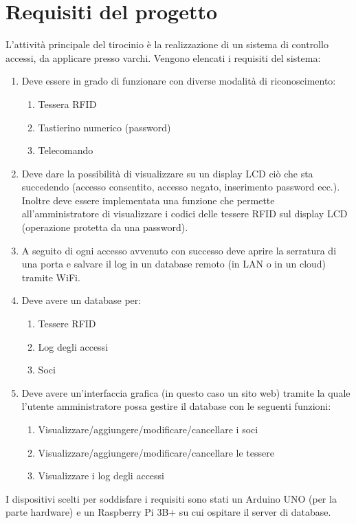 \documentclass[12pt]{report}
\begin{document}
\pagebreak
  
%
\section{Requisiti del progetto}\label{sec:req}
%

L'attività principale del tirocinio è la realizzazione di un sistema di controllo accessi, da applicare presso varchi. Vengono elencati i requisiti del sistema:

\begin{enumerate}
	\item Deve essere in grado di funzionare con diverse modalità di riconoscimento:
	\begin{enumerate}
		\item Tessera RFID
		\item Tastierino numerico (password)
		\item Telecomando 
	\end{enumerate}
	\item Deve dare la possibilità di visualizzare su un display LCD ciò che sta succedendo (accesso consentito, accesso negato, inserimento password ecc.). Inoltre deve essere implementata una funzione che permette all'amministratore di visualizzare i codici delle tessere RFID sul display LCD (operazione protetta da una password).
	\item A seguito di ogni accesso avvenuto con successo deve aprire la serratura di una porta e salvare il log in un database remoto (in LAN o in un cloud) tramite WiFi.
	\item Deve avere un database per:
	\begin{enumerate}
		\item Tessere RFID
		\item Log degli accessi
		\item Soci
	\end{enumerate}
	\item Deve avere un'interfaccia grafica (in questo caso un sito web) tramite la quale l'utente amministratore possa gestire il database con le seguenti funzioni: 
	\begin{enumerate}
		\item Visualizzare/aggiungere/modificare/cancellare i soci 
		\item Visualizzare/aggiungere/modificare/cancellare le tessere 
		\item Visualizzare i log degli accessi
	\end{enumerate}
\end{enumerate}
I dispositivi scelti per soddisfare i requisiti sono stati un Arduino UNO (per la parte hardware) e un Raspberry Pi 3B+ su cui ospitare il server di database. 
\end{document}
